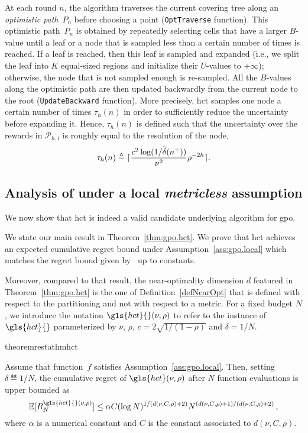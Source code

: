 At each round $n$, the algorithm traverses the current covering tree along an \emph{optimistic path}~$P_n$ before choosing a point (\texttt{OptTraverse} function). This optimistic path~$P_n$ is obtained by repeatedly selecting cells that have a larger $B$-value until a leaf or a node that is sampled less than a certain number of times is reached. If a leaf is reached, then this leaf is sampled and expanded (i.e., we split the leaf into $K$ equal-sized regions and initialize their $U$-values to $+\infty$); otherwise, the node that is not sampled enough is re-sampled. All the $B$-values along the optimistic path are then updated backwardly from the current node to the root (\texttt{UpdateBackward} function). More precisely, \gls{hct}{} samples one node a certain number of times $\tau_h(n)$ in order to sufficiently reduce the uncertainty before expanding it. Hence, $\tau_h(n)$ is defined such that the uncertainty over the rewards in $\mathcal{P}_{h,i}$ is roughly equal to the resolution of the node,
\[
	\tau_h(n) \triangleq \lceil\frac{c^2\operatorname{log}(1/\widetilde{\delta}(n^+))}{\nu^2}\rho^{-2h}\rceil.
\]

\subsection{Analysis of \HCT{} \textbf{under a local \emph{metricless} assumption}}\label{sec:gpo.analysis}

We now show that \gls{hct} is indeed a valid candidate underlying algorithm for \gls{gpo}. 

We state our main result in Theorem~\ref{thm:gpo.hct}. We prove that \gls{hct} achieves an expected cumulative regret bound under Assumption~\ref{ass:gpo.local} which matches the regret bound given by~\cite{azar2014online} up to constants.

Moreover, compared to that result, the \gls{near-optimality dimension} $d$ featured in Theorem~\ref{thm:gpo.hct} is the one of Definition~\ref{defNearOpt} that is defined with respect to the partitioning and not with respect to a metric. For a fixed budget $N$, we introduce the notation $\gls{hct}{}(\nu,\rho)$ to refer to the instance of $\gls{hct}{}$ parameterized by $\nu$, $\rho$, $c=2\sqrt{1/(1-\rho)}$ and $\delta = 1/N$.

\begin{restatable}{theorem}{restathmhct}\label{thm:gpo.hct}
\begin{leftbar}[theorembar]
	Assume that function~$f$ satisfies Assumption~\ref{ass:gpo.local}. Then, setting $\delta \eqdef 1/N$, the cumulative regret of ${\gls{hct}}(\nu,\rho)$ after $N$ function evaluations is upper bounded as 
\[
	\mathbb{E}[R_N^{\gls{hct}{}(\nu,\rho)}] \leq \alpha C (\log N)^{1/(d(\nu,C,\rho)+2)}N^{(d(\nu,C,\rho)+1)/(d(\nu,C,\rho)+2)}\,,
\]
where $\alpha$ is a numerical constant and $C$ is the constant associated to $d(\nu,C,\rho)$.
\end{leftbar}
\end{restatable}

